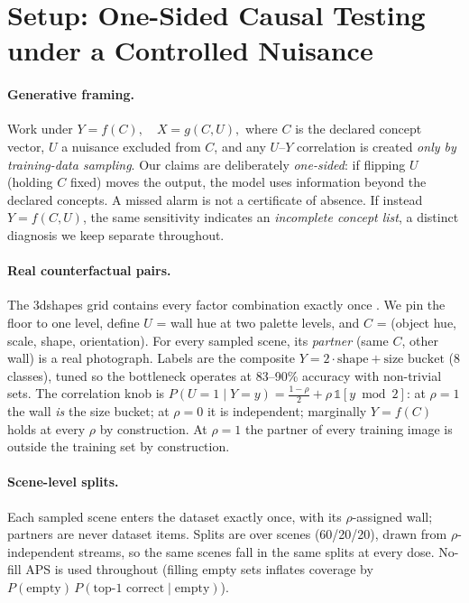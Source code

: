 \documentclass[11pt]{article}
\begin{document}
\section{Setup: One-Sided Causal Testing under a Controlled Nuisance}
\label{sec:setup}

\paragraph{Generative framing.} Work under
$Y = f(C), \quad X = g(C, U),$
where $C$ is the declared concept vector, $U$ a nuisance excluded from $C$, and
any $U$--$Y$ correlation is created \emph{only by training-data sampling}. Our
claims are deliberately \emph{one-sided}: if flipping $U$ (holding $C$ fixed)
moves the output, the model uses information beyond the declared concepts. A
missed alarm is not a certificate of absence. If instead $Y=f(C,U)$, the same
sensitivity indicates an \emph{incomplete concept list}, a distinct diagnosis
we keep separate throughout.

\paragraph{Real counterfactual pairs.} The 3dshapes grid contains every factor
combination exactly once \citep{burgess2018disentangling}. We pin the floor to
one level, define $U$ = wall hue at two palette levels, and $C$ =
(object hue, scale, shape, orientation). For every sampled scene, its
\emph{partner} (same $C$, other wall) is a real photograph. Labels are the
composite $Y = 2\cdot\text{shape} + \text{size bucket}$ (8 classes), tuned so
the bottleneck operates at 83--90\% accuracy with non-trivial sets. The
correlation knob is
$P(U{=}1 \mid Y{=}y) = \tfrac{1-\rho}{2} + \rho\,\mathbb{1}[y \bmod 2]$:
at $\rho=1$ the wall \emph{is} the size bucket; at $\rho=0$ it is independent;
marginally $Y=f(C)$ holds at every $\rho$ by construction. At $\rho=1$ the
partner of every training image is outside the training set by construction.

\paragraph{Scene-level splits.} Each sampled scene enters the dataset exactly
once, with its $\rho$-assigned wall; partners are never dataset items. Splits
are over scenes (60/20/20), drawn from $\rho$-independent streams, so the same
scenes fall in the same splits at every dose. No-fill APS
\citep{romano2020classification} is used throughout (filling empty sets
inflates coverage by $P(\text{empty})\,P(\text{top-1 correct}\mid\text{empty})$).
\end{document}
